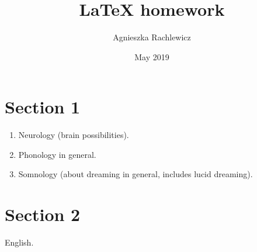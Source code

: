 \documentclass{article}
\title{LaTeX homework}
\author{Agnieszka Rachlewicz }
\date{May 2019}
\begin{document}
\maketitle

\section{Section 1}
\begin{enumerate}
  \item Neurology (brain possibilities).
  \item Phonology in general.
  \item Somnology (about dreaming in general, includes lucid dreaming).
\end{enumerate}
\section{Section 2}

English.\newline 
\end{document}
